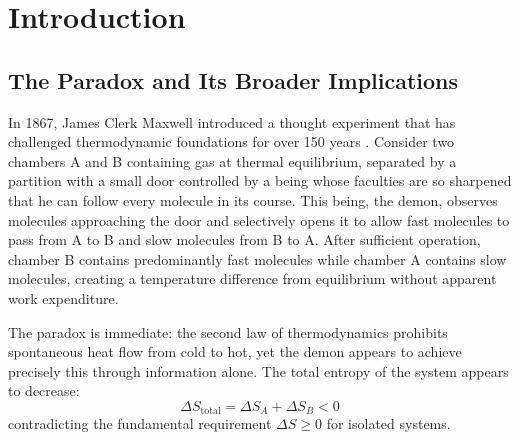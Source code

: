 \documentclass[12pt,a4paper]{article}
\theoremstyle{definition}
\theoremstyle{remark}
\begin{document}
\begin{abstract}
  The resolution requires no information-theoretic arguments, no quantum considerations, and no appeal to measurement costs. The Second Law is explained purely through the geometry of phase-lock networks and the mathematics of categorical completion, revealing thermodynamic irreversibility as topological navigation through categorical state space.

\textbf{Keywords:} Maxwell's Demon, phase-lock networks, categorical completion, thermodynamic irreversibility, Van der Waals interactions, topological entropy, Gibbs paradox, symmetric entropy increase, Le Chatelier's principle, chemical equilibrium, heat-entropy decoupling, velocity-temperature non-correspondence, Maxwell-Boltzmann overlap, velocity-entropy independence, category error
\end{abstract}

\tableofcontents
\newpage

\section{Introduction}

\subsection{The Paradox and Its Broader Implications}

In 1867, James Clerk Maxwell introduced a thought experiment that has challenged thermodynamic foundations for over 150 years \citep{maxwell1871theory}. Consider two chambers A and B containing gas at thermal equilibrium, separated by a partition with a small door controlled by a being whose faculties are so sharpened that he can follow every molecule in its course. This being, the demon, observes molecules approaching the door and selectively opens it to allow fast molecules to pass from A to B and slow molecules from B to A. After sufficient operation, chamber B contains predominantly fast molecules while chamber A contains slow molecules, creating a temperature difference from equilibrium without apparent work expenditure.

The paradox is immediate: the second law of thermodynamics prohibits spontaneous heat flow from cold to hot, yet the demon appears to achieve precisely this through information alone. The total entropy of the system appears to decrease:
\begin{equation}
\Delta S_{\text{total}} = \Delta S_A + \Delta S_B < 0
\label{eq:entropy_decrease}
\end{equation}
contradicting the fundamental requirement $\Delta S \geq 0$ for isolated systems.
\end{document}
